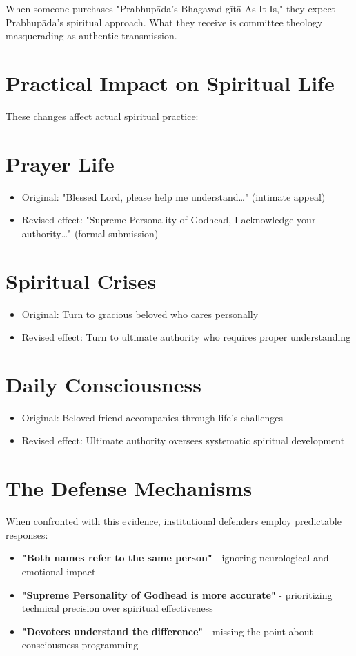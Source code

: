 \documentclass[11pt,twoside]{book}
\begin{document}
When someone purchases "Prabhupāda's Bhagavad-gītā As It Is," they expect Prabhupāda's spiritual approach. What they receive is committee theology masquerading as authentic transmission.
\section*{Practical Impact on Spiritual Life}
\label{sec:org46ecb69}

These changes affect actual spiritual practice:
\section*{Prayer Life}
\label{sec:org07f4013}
\begin{itemize}
\item Original: "Blessed Lord, please help me understand\ldots{}" (intimate appeal)
\item Revised effect: "Supreme Personality of Godhead, I acknowledge your authority\ldots{}" (formal submission)
\end{itemize}
\section*{Spiritual Crises}
\label{sec:orgc7fa715}
\begin{itemize}
\item Original: Turn to gracious beloved who cares personally
\item Revised effect: Turn to ultimate authority who requires proper understanding
\end{itemize}
\section*{Daily Consciousness}
\label{sec:org45b24a0}
\begin{itemize}
\item Original: Beloved friend accompanies through life's challenges
\item Revised effect: Ultimate authority oversees systematic spiritual development
\end{itemize}
\section*{The Defense Mechanisms}
\label{sec:org6f92afc}

When confronted with this evidence, institutional defenders employ predictable responses:

\begin{itemize}
\item \textbf{\textbf{"Both names refer to the same person"}} - ignoring neurological and emotional impact
\item \textbf{\textbf{"Supreme Personality of Godhead is more accurate"}} - prioritizing technical precision over spiritual effectiveness
\item \textbf{\textbf{"Devotees understand the difference"}} - missing the point about consciousness programming
\end{itemize}
\end{document}
